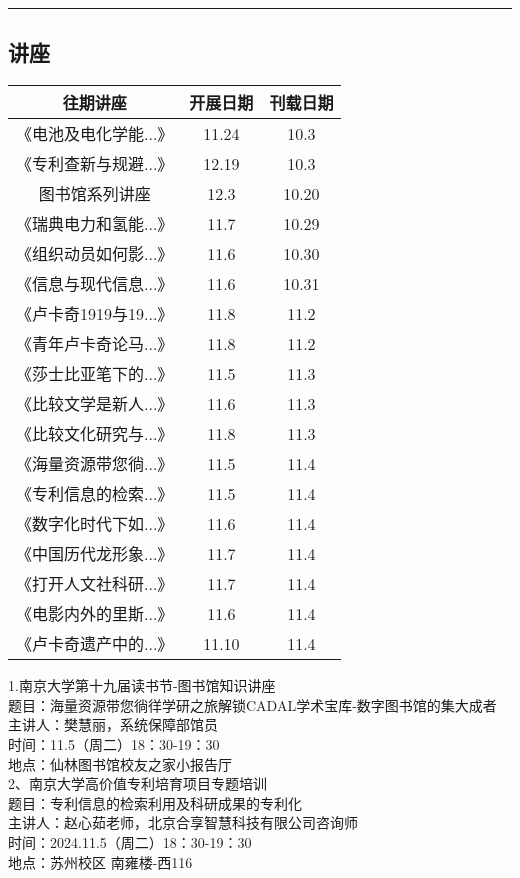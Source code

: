 \documentclass[letterpaper, 12pt]{article}
\begin{document}
\hrule
\pagebreak
\begin{multicols}{2}

\section{讲座}
\begin{tabular}{|c|c|c|}
    \hline
    往期讲座 & 开展日期 & 刊载日期\\
    \hline\hline
    《电池及电化学能...》 & 11.24 & 10.3\\
    《专利查新与规避...》 & 12.19 & 10.3\\
    图书馆系列讲座 & 12.3 & 10.20\\
    《瑞典电力和氢能...》 & 11.7 & 10.29\\
    《组织动员如何影...》 & 11.6 & 10.30\\
    《信息与现代信息...》 & 11.6 & 10.31\\
    《卢卡奇1919与19...》 & 11.8 & 11.2\\
    《青年卢卡奇论马...》 & 11.8 & 11.2\\
    《莎士比亚笔下的...》 & 11.5 & 11.3\\
    《比较文学是新人...》 & 11.6 & 11.3\\
    《比较文化研究与...》 & 11.8 & 11.3\\
    《海量资源带您徜...》 & 11.5 & 11.4\\
    《专利信息的检索...》 & 11.5 & 11.4\\
    《数字化时代下如...》 & 11.6 & 11.4\\
    《中国历代龙形象...》 & 11.7 & 11.4\\
    《打开人文社科研...》 & 11.7 & 11.4\\
    《电影内外的里斯...》 & 11.6 & 11.4\\
    《卢卡奇遗产中的...》 & 11.10 & 11.4\\
    \hline
\end{tabular}

1.南京大学第十九届读书节-图书馆知识讲座\\
题目：海量资源带您徜徉学研之旅解锁CADAL学术宝库-数字图书馆的集大成者\\
主讲人：樊慧丽，系统保障部馆员\\
时间：11.5（周二）18：30-19：30\\
地点：仙林图书馆校友之家小报告厅\\

2、南京大学高价值专利培育项目专题培训\\
题目：专利信息的检索利用及科研成果的专利化\\
主讲人：赵心茹老师，北京合享智慧科技有限公司咨询师\\
时间：2024.11.5（周二）18：30-19：30\\
地点：苏州校区 南雍楼-西116\\


\end{multicols}
\end{document}
